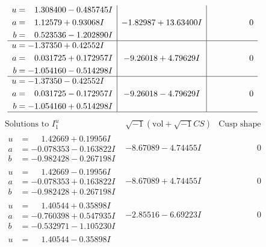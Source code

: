 \documentclass[1p]{elsarticle_modified}
\theoremstyle{definition}
\newcommand{\I}{\sqrt{-1}}
\begin{document}
$$\begin{array}{c|c|c}
\begin{aligned}
u &= \phantom{-}1.308400 - 0.485745 I \\
a &= \phantom{-}1.12579 + 0.93068 I \\
b &= \phantom{-}0.523536 - 1.202890 I\end{aligned}
 & -1.82987 + 13.63400 I & \phantom{-0.000000 } 0 \\ \hline\begin{aligned}
u &= -1.37350 + 0.42552 I \\
a &= \phantom{-}0.031725 + 0.172957 I \\
b &= -1.054160 - 0.514298 I\end{aligned}
 & -9.26018 + 4.79629 I & \phantom{-0.000000 } 0 \\ \hline\begin{aligned}
u &= -1.37350 - 0.42552 I \\
a &= \phantom{-}0.031725 - 0.172957 I \\
b &= -1.054160 + 0.514298 I\end{aligned}
 & -9.26018 - 4.79629 I & \phantom{-0.000000 } 0\\
 \hline 
 \end{array}$$\newpage$$\begin{array}{c|c|c}  
\text{Solutions to }I^u_{1}& \I (\text{vol} + \sqrt{-1}CS) & \text{Cusp shape}\\
 \hline 
\begin{aligned}
u &= \phantom{-}1.42669 + 0.19956 I \\
a &= -0.078353 - 0.163822 I \\
b &= -0.982428 - 0.267198 I\end{aligned}
 & -8.67089 - 4.74455 I & \phantom{-0.000000 } 0 \\ \hline\begin{aligned}
u &= \phantom{-}1.42669 - 0.19956 I \\
a &= -0.078353 + 0.163822 I \\
b &= -0.982428 + 0.267198 I\end{aligned}
 & -8.67089 + 4.74455 I & \phantom{-0.000000 } 0 \\ \hline\begin{aligned}
u &= \phantom{-}1.40544 + 0.35898 I \\
a &= -0.760398 + 0.547935 I \\
b &= -0.532971 - 1.105230 I\end{aligned}
 & -2.85516 - 6.69223 I & \phantom{-0.000000 } 0 \\ \hline\begin{aligned}
u &= \phantom{-}1.40544 - 0.35898 I \\

\end{aligned}
\end{array}$$
\end{document}
